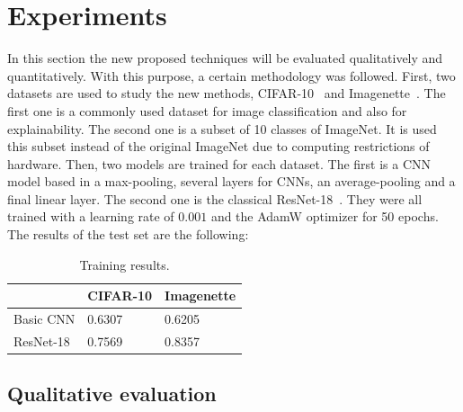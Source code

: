 \documentclass[preprint,12pt]{elsarticle}
\begin{document}
\section{Experiments}
\label{sec:experiments}
In this section the new proposed techniques will be evaluated qualitatively and quantitatively. With this purpose, a certain methodology was followed. First, two datasets are used to study the new methods, {CIFAR-10}~\cite{DatasetCIFAR} and Imagenette~\cite{Imagenette2022}. The first one is a commonly used dataset for image classification and also for explainability. The second one is a subset of 10 classes of ImageNet. It is used this subset instead of the original ImageNet due to computing restrictions of hardware. Then, two models are trained for each dataset. The first is a CNN model based in a max-pooling, several layers for CNNs, an average-pooling and a final linear layer. The second one is the classical ResNet-18~\cite{He2016}. They were all trained with a learning rate of $0.001$ and the AdamW optimizer for 50 epochs. The results of the test set are the following:

\begin{table}[ht]
  \centering
  \small
  \caption{Training results.}
  \label{tab: training results}
  \begin{tabular}{L{2cm}C{2cm}C{2cm}}
    \toprule
    {} & CIFAR-10 & Imagenette \\
    \midrule
    Basic CNN & 0.6307 & 0.6205 \\
    ResNet-18  & 0.7569 & 0.8357 \\
    \bottomrule
  \end{tabular}
\end{table}

\subsection{Qualitative evaluation}
\end{document}

